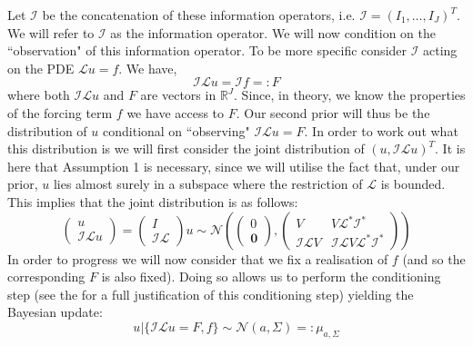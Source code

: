 Let $\mathcal{I}$ be the concatenation of these information operators, i.e. $\mathcal{I}=(I_1,\dots,I_J)^{T}$. We will refer to $\mathcal{I}$ as the information operator. We will now condition on the ``observation" of this information operator. To be more specific consider $\mathcal{I}$ acting on the PDE $\mathcal{L}u=f$. We have,
\begin{equation*}
    \mathcal{I}\mathcal{L}u=\mathcal{I}f=:F
\end{equation*}
where both $\mathcal{I}\mathcal{L}u$ and $F$ are vectors in $\mathbb{R}^{J}$. Since, in theory, we know the properties of the forcing term $f$ we have access to $F$. Our second prior will thus be the distribution of $u$ conditional on ``observing" $\mathcal{I}\mathcal{L}u=F$. In order to work out what this distribution is we will first consider the joint distribution of $(u,\mathcal{I}\mathcal{L}u)^{T}$. It is here that Assumption 1 is necessary, since we will utilise the fact that, under our prior, $u$ lies almost surely in a subspace where the restriction of $\mathcal{L}$ is bounded. This implies that the joint distribution is as follows:
\begin{equation}
    \label{jointInfoDist}
    \begin{pmatrix}
    u \\
    \mathcal{I}\mathcal{L}u
    \end{pmatrix} =
    \begin{pmatrix}
    I \\ \mathcal{I}\mathcal{L}
    \end{pmatrix} u \sim \mathcal{N}\left(
    \begin{pmatrix}
    0 \\
    \mathbf{0}
    \end{pmatrix},
    \begin{pmatrix}
    V & V\mathcal{L}^{*}\mathcal{I}^{*} \\
    \mathcal{I}\mathcal{L}V & \mathcal{I}\mathcal{L}V\mathcal{L}^{*}\mathcal{I}^{*}
    \end{pmatrix}
    \right)
\end{equation}
In order to progress we will now consider that we fix a realisation of $f$ (and so the corresponding $F$ is also fixed). Doing so allows us to perform the conditioning step (see the \textcolor{blue}{} for a full justification of this conditioning step) yielding the Bayesian update:
\begin{equation}
    \label{conditionalDistnFixed_f}
    u|\{\mathcal{I}\mathcal{L}u=F,f\}\sim\mathcal{N}(a,\Sigma)=:\mu_{a,\Sigma}
\end{equation}

